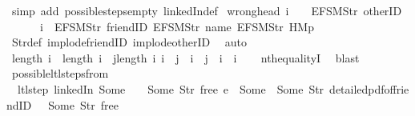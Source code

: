 \begin{isabellebody}
\ {\isacharparenleft}simp\ add{\isacharcolon}\ possible{\isacharunderscore}steps{\isacharunderscore}empty\ linkedIn{\isacharunderscore}def{\isacharparenright}%
\endisatagproof
{\isafoldproof}%
%
\isadelimproof
\isanewline
%
\endisadelimproof
\isanewline
{}\isamarkupfalse%
\ wrong{\isacharunderscore}head{\isacharcolon}\ {\isachardoublequoteopen}i\ {\isacharbang}\ {}\ {\isacharequal}\ EFSM{\isachardot}Str\ {\isacharprime}{\isacharprime}otherID{\isacharprime}{\isacharprime}\ {\isasymLongrightarrow}\isanewline
\ \ \ \ \ \ i\ {\isasymnoteq}\ {\isacharbrackleft}EFSM{\isachardot}Str\ {\isacharprime}{\isacharprime}friendID{\isacharprime}{\isacharprime}{\isacharcomma}\ EFSM{\isachardot}Str\ {\isacharprime}{\isacharprime}name{\isacharprime}{\isacharprime}{\isacharcomma}\ EFSM{\isachardot}Str\ {\isacharprime}{\isacharprime}HM{}p{\isacharprime}{\isacharprime}{\isacharbrackright}{\isachardoublequoteclose}\isanewline
%
\isadelimproof
\ \ %
\endisadelimproof
%
\isatagproof
{}\isamarkupfalse%
\ Str{\isacharunderscore}def\ implode{\isacharunderscore}friendID\ implode{\isacharunderscore}otherID\ \isamarkupfalse%
\ auto%
\endisatagproof
{\isafoldproof}%
%
\isadelimproof
\isanewline
%
\endisadelimproof
\isanewline
{}\isamarkupfalse%
\ {\isachardoublequoteopen}length\ i\ {\isacharequal}\ length\ i{\isacharprime}\ {\isasymLongrightarrow}\ {\isasymforall}j{\isacharless}length\ i{\isachardot}\ i\ {\isacharbang}\ j\ {\isacharequal}\ i{\isacharprime}\ {\isacharbang}\ j\ {\isasymLongrightarrow}\ i\ {\isacharequal}\ i{\isacharprime}{\isachardoublequoteclose}\isanewline
%
\isadelimproof
\ \ %
\endisadelimproof
%
\isatagproof
{}\isamarkupfalse%
\ nth{\isacharunderscore}equalityI\ \isamarkupfalse%
\ blast%
\endisatagproof
{\isafoldproof}%
%
\isadelimproof
\isanewline
%
\endisadelimproof
\isanewline
{}\isamarkupfalse%
\ possible{\isacharunderscore}ltl{\isacharunderscore}steps{\isacharunderscore}from{\isacharunderscore}{}{\isacharcolon}\isanewline
\ \ {\isachardoublequoteopen}ltl{\isacharunderscore}step\ linkedIn\ {\isacharparenleft}Some\ {}{\isacharparenright}\ {\isacharparenleft}{\isacharless}{\isachargreater}{\isacharparenleft}{}\ {\isachardollar}{\isacharcolon}{\isacharequal}\ Some\ {\isacharparenleft}Str\ {\isacharprime}{\isacharprime}free{\isacharprime}{\isacharprime}{\isacharparenright}{\isacharparenright}{\isacharparenright}\ e\ {\isacharequal}\ {\isacharparenleft}Some\ {}{\isacharcomma}\ {\isacharbrackleft}Some\ {\isacharparenleft}Str\ {\isacharprime}{\isacharprime}detailed{\isacharunderscore}pdf{\isacharunderscore}of{\isacharunderscore}friendID{\isacharprime}{\isacharprime}{\isacharparenright}{\isacharbrackright}{\isacharcomma}\ {\isacharparenleft}{\isacharless}{\isachargreater}{\isacharparenleft}{}\ {\isachardollar}{\isacharcolon}{\isacharequal}\ Some\ {\isacharparenleft}Str\ {\isacharprime}{\isacharprime}free{\isacharprime}{\isacharprime}{\isacharparenright}{\isacharparenright}{\isacharparenright}{\isacharparenright}\ {\isasymor}\isanewline

\end{isabellebody}
